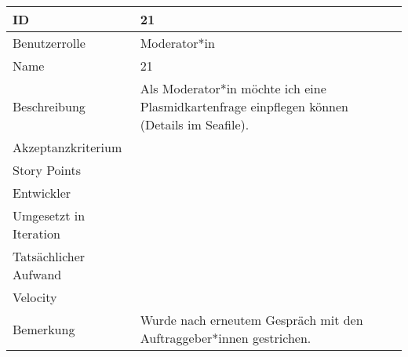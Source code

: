 \begin{tabularx}{\textwidth}{|p{}|X|}
	\hline
	ID & 21\\
	\hline
	Benutzerrolle & Moderator*in\\
	\hline
	Name & 21\\
	\hline
	Beschreibung & Als Moderator*in möchte ich eine Plasmidkartenfrage einpflegen können (Details im Seafile).\\
	\hline
	Akzeptanzkriterium & \\
	\hline
	Story Points & \\
	\hline
	Entwickler & \\
	\hline
	Umgesetzt in Iteration & \\ 
	\hline
	Tatsächlicher Aufwand & \\
	\hline
	Velocity & \\
	\hline
	Bemerkung & Wurde nach erneutem Gespräch mit den Auftraggeber*innen gestrichen.\\
	\hline
\end{tabularx}
\vspace{20pt}
